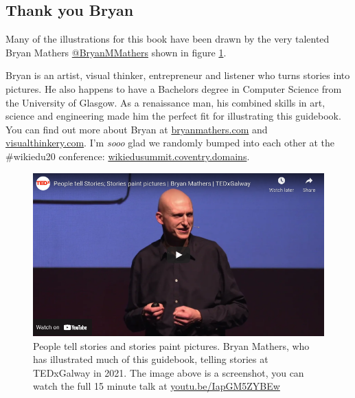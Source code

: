 \documentclass[
]{book}
\begin{document}
\hypertarget{visualthinkery}{%
\subsection{Thank you Bryan}\label{visualthinkery}}

Many of the illustrations for this book have been drawn by the very talented Bryan Mathers \href{https://twitter.com/BryanMMathers/}{@BryanMMathers} shown in figure \ref{fig:tedx-galway-fig}.

Bryan is an artist, visual thinker, entrepreneur and listener who turns stories into pictures. He also happens to have a Bachelors degree in Computer Science from the University of Glasgow. As a renaissance man, his combined skills in art, science and engineering made him the perfect fit for illustrating this guidebook. You can find out more about Bryan at \href{https://bryanmmathers.com}{bryanmathers.com} and \href{https://visualthinkery.com}{visualthinkery.com}. I'm \emph{sooo} glad we randomly bumped into each other at the \#wikiedu20 conference: \href{https://wikiedusummit.coventry.domains/}{wikiedusummit.coventry.domains}.

\begin{figure}

{\centering \includegraphics[width=1\linewidth]{images/bryan-mathers-tedx-galway} 

}

\caption{People tell stories and stories paint pictures. Bryan Mathers, who has illustrated much of this guidebook, telling stories at TEDxGalway in 2021. The image above is a screenshot, you can watch the full 15 minute talk at \href{https://youtu.be/IapGM5ZYBEw}{youtu.be/IapGM5ZYBEw}}\label{fig:tedx-galway-fig}
\end{figure}
\end{document}
